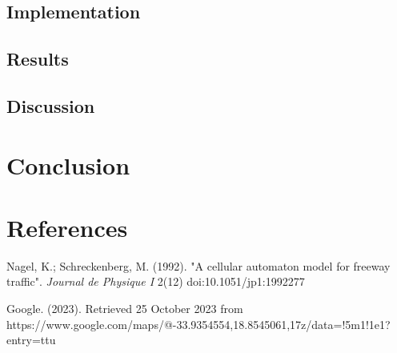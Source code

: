 \documentclass{article}
\begin{document}
\subsection*{Implementation}

\subsection*{Results}

\subsection*{Discussion}

\section*{Conclusion}

\section*{References}


Nagel, K.; Schreckenberg, M. (1992). "A cellular automaton model for freeway traffic". \textit{Journal de Physique I} 2(12) doi:10.1051/jp1:1992277

Google. (2023). Retrieved 25 October 2023 from https://www.google.com/maps/@-33.9354554,18.8545061,17z/data=!5m1!1e1?entry=ttu
\end{document}
